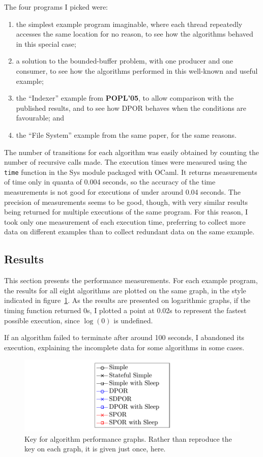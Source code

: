 \documentclass[12pt,a4paper,twoside,openright]{report}
\begin{document}
The four programs I picked were:
\begin{enumerate}
	\item the simplest example program imaginable, where
	each thread repeatedly accesses the same location
	for no reason,
	to see how the algorithms behaved in this special
	case;
	\item a solution to the bounded-buffer problem,
	with one producer and one consumer, to see how
	the algorithms performed in this well-known
	and useful example;
	\item the ``Indexer'' example from \textbf{POPL'05},
	to allow comparison with the published results, and
	to see how DPOR behaves when the conditions are
	favourable; and
	\item the ``File System'' example from the same paper,
	for the same reasons.
\end{enumerate}

The number of transitions for each algorithm was easily
obtained by counting the number of recursive calls made.
The execution times were measured using the \texttt{time}
function in the Sys module packaged with OCaml. It returns
measurements of time only in quanta of 0.004 seconds,
so the accuracy of the time measurements is not good for
executions of under around 0.04 seconds.
The precision of measurements seems
to be good, though, with very similar results being returned
for multiple executions of the same program. For this reason,
I took only one measurement of each execution time, preferring
to collect more data on different examples than to collect
redundant data on the same example.

\subsection{Results}
This section presents the performance measurements.
For each example program, the results for all eight
algorithms are plotted on the same graph, in the
style indicated in figure~\ref{fig:key}.
As the results are
presented on logarithmic graphs, if the timing function
returned 0s, I plotted a point at 0.02s
to represent the fastest possible execution, since
$\log(0)$ is undefined.

If an algorithm failed to terminate after around
100 seconds, I abandoned its execution, explaining
the incomplete data for some algorithms in some cases.

\begin{figure}
	\includegraphics[width=\textwidth]{key}
	\caption[Key for algorithm performance graphs.]
	{Key for algorithm performance graphs.
		Rather than reproduce the key on each graph,
		it is given just once, here.}
	\label{fig:key}
\end{figure}
\end{document}
